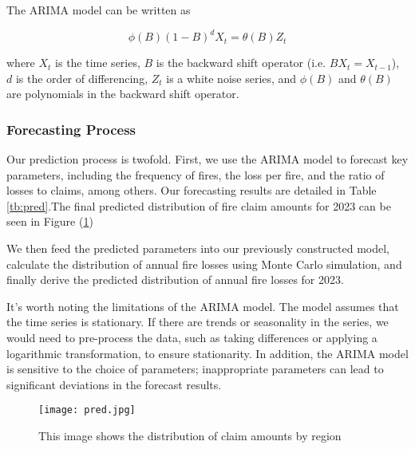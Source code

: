 \documentclass[12pt]{article}  %
\begin{document}
The ARIMA model can be written as

\begin{equation}
\phi(B) (1-B)^d X_t = \theta(B) Z_t
\end{equation}

where $X_t$ is the time series, $B$ is the backward shift operator (i.e. $BX_t = X_{t-1}$), $d$ is the order of differencing, $Z_t$ is a white noise series, and $\phi(B)$ and $\theta(B)$ are polynomials in the backward shift operator.

\subsubsection{Forecasting Process}

Our prediction process is twofold. First, we use the ARIMA model to forecast key parameters, including the frequency of fires, the loss per fire, and the ratio of losses to claims, among others. Our forecasting results are detailed in Table \ref{tb:pred}.The final predicted distribution of fire claim amounts for 2023 can be seen in Figure (\ref{fig:pred})

We then feed the predicted parameters into our previously constructed model, calculate the distribution of annual fire losses using Monte Carlo simulation, and finally derive the predicted distribution of annual fire losses for 2023.

It's worth noting the limitations of the ARIMA model. The model assumes that the time series is stationary. If there are trends or seasonality in the series, we would need to pre-process the data, such as taking differences or applying a logarithmic transformation, to ensure stationarity. In addition, the ARIMA model is sensitive to the choice of parameters; inappropriate parameters can lead to significant deviations in the forecast results.

\begin{figure}
    \centering
    \texttt{[image: pred.jpg]}
    \caption{This image shows the distribution of claim amounts by region}\label{fig:pred}
\end{figure}
\end{document}
